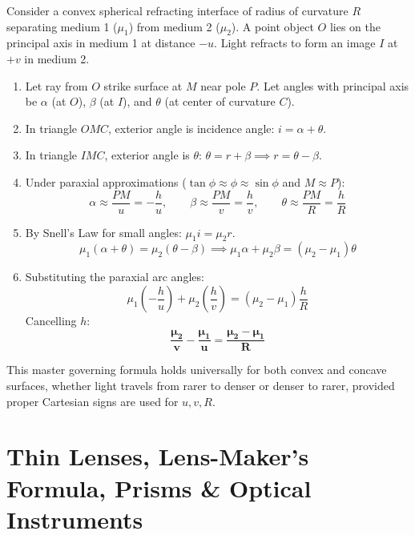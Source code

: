 \documentclass[10pt,a4paper]{article}
\begin{document}
\begin{formulabox}
Consider a convex spherical refracting interface of radius of curvature $R$ separating medium 1 ($\mu_1$) from medium 2 ($\mu_2$). A point object $O$ lies on the principal axis in medium 1 at distance $-u$. Light refracts to form an image $I$ at $+v$ in medium 2.
\begin{enumerate}
  \item Let ray from $O$ strike surface at $M$ near pole $P$. Let angles with principal axis be $\alpha$ (at $O$), $\beta$ (at $I$), and $\theta$ (at center of curvature $C$).
  \item In triangle $OMC$, exterior angle is incidence angle: $i = \alpha + \theta$.
  \item In triangle $IMC$, exterior angle is $\theta$: $\theta = r + \beta \implies r = \theta - \beta$.
  \item Under paraxial approximations ($\tan\phi \approx \phi \approx \sin\phi$ and $M \approx P$):
  \begin{equation}
    \alpha \approx \frac{PM}{u} = -\frac{h}{u}, \qquad \beta \approx \frac{PM}{v} = \frac{h}{v}, \qquad \theta \approx \frac{PM}{R} = \frac{h}{R}
  \end{equation}
  \item By Snell's Law for small angles: $\mu_1 i = \mu_2 r$.
  \begin{equation}
    \mu_1 (\alpha + \theta) = \mu_2 (\theta - \beta) \implies \mu_1 \alpha + \mu_2 \beta = (\mu_2 - \mu_1)\theta
  \end{equation}
  \item Substituting the paraxial arc angles:
  \begin{equation}
    \mu_1 \left(-\frac{h}{u}\right) + \mu_2 \left(\frac{h}{v}\right) = (\mu_2 - \mu_1)\frac{h}{R}
  \end{equation}
  Cancelling $h$:
  \begin{equation}
    \mathbf{\frac{\mu_2}{v} - \frac{\mu_1}{u} = \frac{\mu_2 - \mu_1}{R}}
  \end{equation}
\end{enumerate}
This master governing formula holds universally for both convex and concave surfaces, whether light travels from rarer to denser or denser to rarer, provided proper Cartesian signs are used for $u, v, R$.
\end{formulabox}

\section{Thin Lenses, Lens-Maker's Formula, Prisms \& Optical Instruments}
\end{document}

